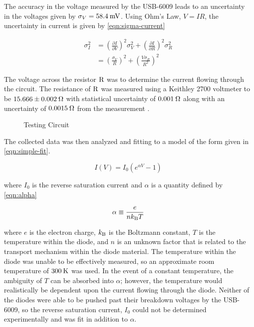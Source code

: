 \documentclass[reprint]{revtex4-1}
\begin{document}
The accuracy in the voltage measured by the USB-6009 leads to an uncertainty in the voltages given by $\sigma_V = 58.4\:\rm{mV}$. Using Ohm's Law, $V = IR$, the uncertainty in current is given by \cref{eqn:sigma-current}

\begin{equation} \label{eqn:sigma-current}
\begin{split}
\sigma_I^2 &= \left( \frac{\partial I}{\partial V} \right)^2 \sigma_V^2 + \left( \frac{\partial I}{\partial R} \right)^2 \sigma_R^2 \\
&= \left( \frac{\sigma_V}{R} \right)^2 + \left( \frac{ V \sigma_R }{R^2} \right)^2
\end{split}
\end{equation}

The voltage across the resistor $\rm{R}$ was to determine the current flowing through the circuit. The resistance of $\rm{R}$ was measured using a Keithley 2700 voltmeter to be $15.666 \pm 0.002\:\rm{\Omega}$ with statistical uncertainty of $0.001\:\rm{\Omega}$ along with an uncertainty of $0.0015\:\rm{\Omega}$ from the measurement \cite{Keithley2003}.

\begin{figure}


\caption{Testing Circuit}
\label{fig:circuit}
\end{figure}

The collected data was then analyzed and fitting to a model of the form given in \cref{eqn:simple-fit}.

\begin{equation}
I(V) = I_0 \left( e^{\alpha V} - 1 \right)
\label{eqn:simple-fit}
\end{equation}

where $I_0$ is the reverse saturation current and $\alpha$ is a quantity defined by \cref{eqn:alpha}

\begin{equation}
\alpha \equiv \frac{e}{n k_{\rm{B}} T}
\label{eqn:alpha}
\end{equation}

where $e$ is the electron charge, $k_{\rm{B}}$ is the Boltzmann constant, $T$ is the temperature within the diode, and $n$ is an unknown factor that is related to the transport mechanism within the diode material. The temperature within the diode was unable to be effectively measured, so an approximate room temperature of $300\:\rm{K}$ was used. In the event of a constant temperature, the ambiguity of $T$ can be absorbed into $\alpha$; however, the temperature would realistically be dependent upon the current flowing through the diode. Neither of the diodes were able to be pushed past their breakdown voltages by the USB-6009, so the reverse saturation current, $I_0$ could not be determined experimentally and was fit in addition to $\alpha$.
\end{document}
